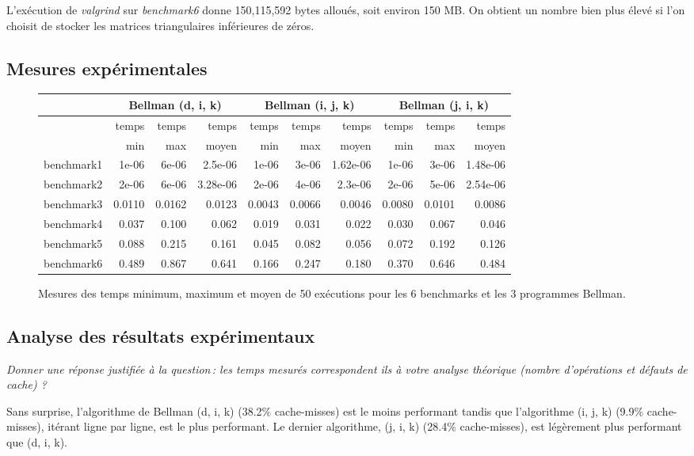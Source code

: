 \documentclass[a4paper, 10pt, french]{article}
\begin{document}
L'exécution de {\em valgrind} sur {\em benchmark6} donne 150,115,592 bytes alloués, soit environ 150 MB. On obtient un nombre bien plus élevé si l'on choisit de stocker les matrices triangulaires inférieures de zéros.

\subsection{Mesures expérimentales}

\begin{figure}[h]
  \begin{center}
    \begin{tabular}{|l||r|r|r|r|r|r|r|r|r||}
      \hline
      \hline
      & \multicolumn{3}{c|}{Bellman (d, i, k)} & \multicolumn{3}{c|}{Bellman (i, j, k)} & \multicolumn{3}{c|}{Bellman (j, i, k)}\\
      \hline
                 & temps & temps & temps & temps & temps & temps & temps & temps & temps \\
                 & min   & max   & moyen & min   & max   & moyen & min   & max   & moyen \\
      \hline
      \hline
      benchmark1 & 1e-06 & 6e-06 & 2.5e-06 & 1e-06 & 3e-06 & 1.62e-06 & 1e-06 & 3e-06 & 1.48e-06 \\
      \hline
      benchmark2 & 2e-06 & 6e-06 & 3.28e-06 & 2e-06 & 4e-06 & 2.3e-06 & 2e-06 & 5e-06 & 2.54e-06 \\
      \hline
      benchmark3 & 0.0110 & 0.0162 & 0.0123 & 0.0043 & 0.0066 & 0.0046 & 0.0080 & 0.0101 & 0.0086 \\
      \hline
      benchmark4 & 0.037 & 0.100 & 0.062 & 0.019 & 0.031 & 0.022 & 0.030 & 0.067 & 0.046 \\
      \hline
      benchmark5 & 0.088 & 0.215 & 0.161 & 0.045 & 0.082 & 0.056 & 0.072 & 0.192 & 0.126 \\
      \hline
      benchmark6 & 0.489 & 0.867 & 0.641 & 0.166 & 0.247 & 0.180 & 0.370 & 0.646 & 0.484 \\
      \hline
      \hline
    \end{tabular}
    \caption{Mesures des temps minimum, maximum et moyen de 50 exécutions pour les 6 benchmarks et les 3 programmes Bellman.}
    \label{table-temps}
  \end{center}
\end{figure}

\subsection{Analyse des résultats expérimentaux}
{\em Donner  une réponse justifiée  à la question\,:
  les  temps mesurés correspondent ils  à votre analyse théorique (nombre d’opérations et défauts de cache) ?
}

Sans surprise, l'algorithme de Bellman (d, i, k) (38.2\% cache-misses) est le moins performant tandis que l'algorithme (i, j, k) (9.9\% cache-misses), itérant ligne par ligne, est le plus performant. Le dernier algorithme, (j, i, k) (28.4\% cache-misses), est légèrement plus performant que (d, i, k).
\end{document}
